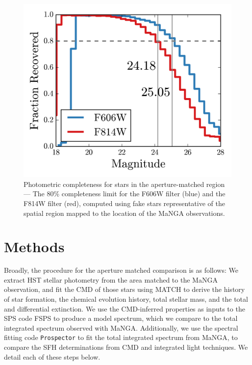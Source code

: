 \documentclass[preprint2]{aastex62}
\begin{document}
\begin{figure}
  \begin{center}
    \includegraphics[width=\linewidth]{figs/f3.png}
    \caption{{\sc Photometric completeness for stars in the aperture-matched region---} The 80\% completeness limit for the F606W filter (blue) and the F814W filter (red), computed using fake stars representative of the spatial region mapped to the location of the MaNGA observations.}
    \label{fig:comp}
  \end{center}
\end{figure}


\section{Methods}\label{sec:methods}

Broadly, the procedure for the aperture matched comparison is as follows: We extract HST stellar photometry from the area matched to the MaNGA observation, and fit the CMD of those stars using MATCH \citep{Dolphin+2002} to derive the history of star formation, the chemical evolution history, total stellar mass, and the total and differential extinction. We use the CMD-inferred properties as inputs to the SPS code FSPS \citep{Conroy+2009} to produce a model spectrum, which we compare to the total integrated spectrum observed with MaNGA. Additionally, we use the spectral fitting code \texttt{Prospector} \citep{Johnson+2017} to fit the total integrated spectrum from MaNGA, to compare the SFH determinations from CMD and integrated light techniques. We detail each of these steps below.
\end{document}
